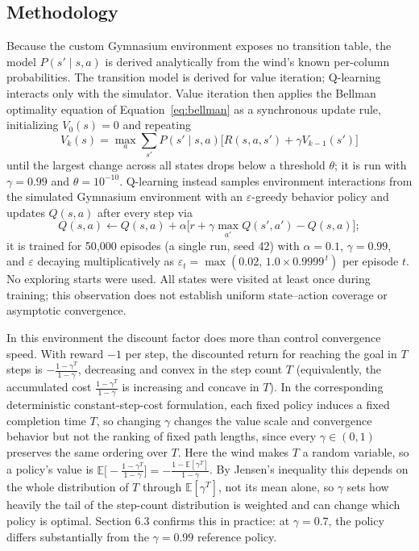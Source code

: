 \documentclass{ai-lab-report}
\begin{document}
\subsection{Methodology}
Because the custom Gymnasium environment exposes no transition table, the model $P(s'\mid s,a)$ is derived analytically from the wind's known per-column probabilities. The transition model is derived for value iteration; Q-learning interacts only with the simulator. Value iteration then applies the Bellman optimality equation of Equation~\eqref{eq:bellman} as a synchronous update rule, initializing $V_0(s)=0$ and repeating
\begin{equation}
V_k(s) = \max_a \sum_{s'}P(s'\mid s,a)\big[R(s,a,s')+\gamma V_{k-1}(s')\big]
\label{eq:a4-vi-update}
\end{equation}
until the largest change across all states drops below a threshold $\theta$; it is run with $\gamma=0.99$ and $\theta=10^{-10}$. Q-learning instead samples environment interactions from the simulated Gymnasium environment with an $\varepsilon$-greedy behavior policy and updates $Q(s,a)$ after every step \citep{sutton2018rl} via
\begin{equation}
Q(s,a)\leftarrow Q(s,a)+\alpha\big[r+\gamma\max_{a'}Q(s',a')-Q(s,a)\big];
\label{eq:a4-ql-update}
\end{equation}
it is trained for 50,000 episodes (a single run, seed 42) with $\alpha=0.1$, $\gamma=0.99$, and $\varepsilon$ decaying multiplicatively as $\varepsilon_t=\max(0.02,\,1.0\times0.9999^{\,t})$ per episode $t$. No exploring starts were used. All states were visited at least once during training; this observation does not establish uniform state--action coverage or asymptotic convergence.

In this environment the discount factor does more than control convergence speed. With reward $-1$ per step, the discounted return for reaching the goal in $T$ steps is $-\tfrac{1-\gamma^{T}}{1-\gamma}$, decreasing and convex in the step count $T$ (equivalently, the accumulated cost $\tfrac{1-\gamma^{T}}{1-\gamma}$ is increasing and concave in $T$). In the corresponding deterministic constant-step-cost formulation, each fixed policy induces a fixed completion time $T$, so changing $\gamma$ changes the value scale and convergence behavior but not the ranking of fixed path lengths, since every $\gamma \in (0,1)$ preserves the same ordering over $T$. Here the wind makes $T$ a random variable, so a policy's value is $\mathbb{E}\!\big[{-}\tfrac{1-\gamma^{T}}{1-\gamma}\big] = -\tfrac{1-\mathbb{E}[\gamma^{T}]}{1-\gamma}$. By Jensen's inequality this depends on the whole distribution of $T$ through $\mathbb{E}[\gamma^{T}]$, not its mean alone, so $\gamma$ sets how heavily the tail of the step-count distribution is weighted and can change which policy is optimal. Section 6.3 confirms this in practice: at $\gamma=0.7$, the policy differs substantially from the $\gamma=0.99$ reference policy.
\end{document}
